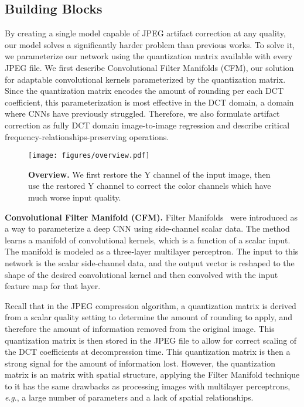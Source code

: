 \documentclass[runningheads]{llncs}
\newcommand{\eg}{\textit{e}.\textit{g}., }
\begin{document}
\subsection{Building Blocks}
\label{sec:app:bb}
By creating a single model capable of JPEG artifact correction at any quality, our model solves a significantly harder problem than previous works. To solve it, we parameterize our network using the  quantization matrix available with every JPEG file. We first describe Convolutional Filter Manifolds (CFM), our solution for adaptable convolutional kernels parameterized by the quantization matrix. Since the quantization matrix encodes the amount of rounding per each DCT coefficient, this parameterization is most effective in the DCT domain, a domain where CNNs have previously struggled. Therefore, we also formulate artifact correction as fully DCT domain image-to-image regression and describe critical frequency-relationships-preserving operations.


\begin{figure}[t]
  \centering
  \texttt{[image: figures/overview.pdf]}
  \caption{\textbf{Overview.} We first restore the Y channel of the input image, then use the restored Y channel to correct
  the color channels which have much worse input quality.}
  \label{fig:overview}
\end{figure}

\noindent\textbf{Convolutional Filter Manifold (CFM).}
Filter Manifolds~\cite{kang2016crowd} were introduced as a way to parameterize a deep CNN using side-channel scalar data. The method learns a manifold of convolutional kernels, which is a function of a scalar input. The manifold is modeled as a three-layer multilayer perceptron. The input to this network is the scalar side-channel data, and the output vector is reshaped to the shape of the desired convolutional kernel and then convolved with the input feature map for that layer.

Recall that in the JPEG compression algorithm, a quantization matrix is derived from a scalar quality setting to determine the amount of rounding to apply, and therefore the amount of information removed from the original image. This quantization matrix is then stored in the JPEG file to allow for correct scaling of the DCT coefficients at decompression time. This quantization matrix is then a strong signal for the amount of information lost. However, the quantization matrix is an  matrix with spatial structure, applying the Filter Manifold technique to it has the same drawbacks as processing images with multilayer perceptrons,
\eg a large number of parameters and a lack of spatial relationships.
\end{document}
